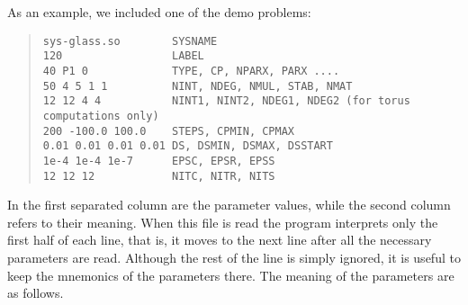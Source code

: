 \documentclass[10pt,a4paper]{ddedoc}
\begin{document}
As an example, we included one of the demo problems:
{ \small \begin{quote} \begin{lstlisting}[basicstyle=\tt,frame=single]
sys-glass.so        SYSNAME
120                 LABEL
40 P1 0             TYPE, CP, NPARX, PARX ....
50 4 5 1 1          NINT, NDEG, NMUL, STAB, NMAT
12 12 4 4           NINT1, NINT2, NDEG1, NDEG2 (for torus computations only)
200 -100.0 100.0    STEPS, CPMIN, CPMAX
0.01 0.01 0.01 0.01 DS, DSMIN, DSMAX, DSSTART
1e-4 1e-4 1e-7      EPSC, EPSR, EPSS
12 12 12            NITC, NITR, NITS
\end{lstlisting} \end{quote} } \noindent
In the first separated column are the parameter values, while the second column refers to their meaning. 
When this file is read the program interprets only the first half of each line, that is, it moves to the next line
after all the necessary parameters are read. Although the rest of the line is simply ignored, 
it is useful to keep the mnemonics of the parameters there. The meaning of the parameters are as
follows.
\end{document}

